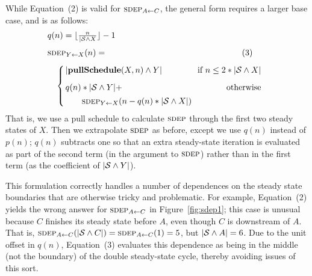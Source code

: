While Equation~(2) is valid for $\sdepf{A}{C}$, the general form
requires a larger base case, and is as follows:
\begin{equation*}
\begin{array}{l}
q(n) = \lfloor \frac{n}{|{\cal S} \wedge X} \rfloor - 1\\[2Ex]
\sdepf{Y}{X}(n) = ~\hspace{2in}\hspace{12pt}(3)\\[2Ex]
\mbox{~}\hspace{6pt}
\left\{\begin{array}{lr}
\hspace{-3.5pt}|{\bf pullSchedule}(X, n) \wedge Y| & \hspace{-3pt} \mbox{if~} n \le 2*|{\cal S} \wedge X| \\[2Ex]
\hspace{-3.5pt}q(n) * |{\cal S} \wedge Y| + & \hspace{-3pt} \mbox{otherwise} \\[1Ex] %
\mbox{~}\hspace{12.5pt} \sdepf{Y}{X}(n - q(n) * |{\cal S} \wedge X|)
\end{array}
\right.
\end{array}
\end{equation*}
That is, we use a pull schedule to calculate $\textsc{sdep}$ through the first
two steady states of $X$.  Then we extrapolate $\textsc{sdep}$ as before,
except we use $q(n)$ instead of $p(n)$; $q(n)$ subtracts one so that an
extra steady-state iteration is evaluated as part of the second term
(in the argument to $\textsc{sdep}$) rather than in the first term (as the
coefficient of $|{\cal S} \wedge Y|$).  

This formulation correctly handles a number of dependences on the
steady state boundaries that are otherwise tricky and problematic.
For example, Equation~(2) yields the wrong answer for $\sdepf{A}{C}$
in Figure~\ref{fig:sdep1}; this case is unusual because $C$ finishes
its steady state before $A$, even though $C$ is downstream of $A$.
That is, $\sdepf{A}{C}(|{\cal S} \wedge C|) = \sdepf{A}{C}(1) = 5$,
but $|{\cal S} \wedge A| = 6$.  Due to the unit offset in $q(n)$,
Equation~(3) evaluates this dependence as being in the middle (not the
boundary) of the double steady-state cycle, thereby avoiding issues of
this sort.

